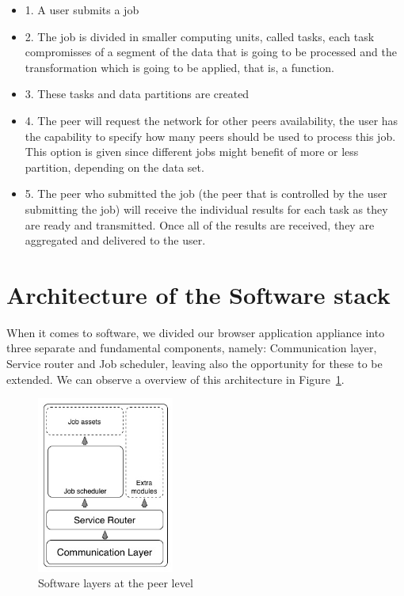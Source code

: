 \begin{itemize}
    \item 1. A user submits a job
    \item 2. The job is divided in smaller computing units, called tasks, each task compromisses of a segment of the data that is going to be processed and the transformation which is going to be applied, that is, a function.
    \item 3. These tasks and data partitions are created
    \item 4. The peer will request the network for other peers availability, the user has the capability to specify how many peers should be used to process this job. This option is given since different jobs might benefit of more or less partition, depending on the data set.
    \item 5. The peer who submitted the job (the peer that is controlled by the user submitting the job) will receive the individual results for each task as they are ready and transmitted. Once all of the results are received, they are aggregated and delivered to the user.
\end{itemize}

\section{Architecture of the Software stack}

When it comes to software, we divided our browser application appliance into three separate and fundamental components, namely: Communication layer, Service router and Job scheduler, leaving also the opportunity for these to be extended. We can observe a overview of this architecture in Figure~\ref{fig:s-a-n-l}.

\begin{figure}[h!]
  \centering
  \includegraphics[width=0.4\textwidth]{figs/software-architecture-node-level}
  \caption{Software layers at the peer level}
  \label{fig:s-a-n-l}
\end{figure}


